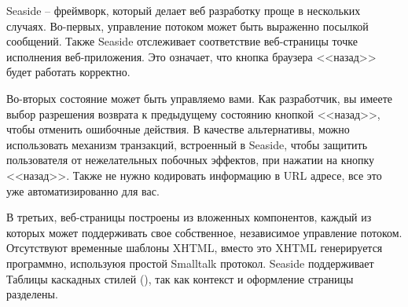 \documentclass[a4paper,10pt,twoside]{book}
\begin{document}


Seaside -- фреймворк, который делает веб разработку проще в нескольких случаях.
Во-первых, управление потоком может быть выраженно посылкой сообщений.
Также Seaside отслеживает соответствие веб-страницы точке исполнения веб-приложения.
Это означает, что кнопка браузера <<назад>> будет работать корректно.



Во-вторых состояние может быть управляемо вами.
Как разработчик, вы имеете выбор разрешения возврата к предыдущему состоянию кнопкой <<назад>>, чтобы отменить ошибочные действия.
В качестве альтернативы, можно использовать механизм транзакций, встроенный в Seaside,
чтобы защитить пользователя от нежелательных побочных эффектов, при нажатии на кнопку <<назад>>.
Также не нужно кодировать информацию в URL адресе, все это уже автоматизированно для вас.



В третьих, веб-страницы построены из вложенных компонентов,
каждый из которых может поддерживать свое собственное,
независимое управление потоком.
Отсутствуют временные шаблоны XHTML,
вместо это XHTML генерируется программно,
используюя простой Smalltalk протокол.
Seaside поддерживает Таблицы каскадных стилей (), так как контекст и оформление страницы разделены.
\end{document}
